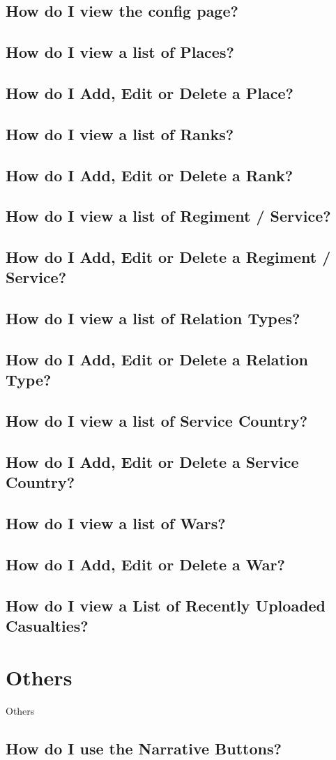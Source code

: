 \documentclass[12pt]{article}
\begin{document}
\subsection{How do I view the config page?}\label{ssec:config}
\subsection{How do I view a list of Places?}
\subsection{How do I Add, Edit or Delete a Place?}
\subsection{How do I view a list of Ranks?}
\subsection{How do I Add, Edit or Delete a Rank?}
\subsection{How do I view a list of Regiment / Service?}
\subsection{How do I Add, Edit or Delete a Regiment / Service?}
\subsection{How do I view a list of Relation Types?}
\subsection{How do I Add, Edit or Delete a Relation Type?}
\subsection{How do I view a list of Service Country?}
\subsection{How do I Add, Edit or Delete a Service Country?}
\subsection{How do I view a list of Wars?}
\subsection{How do I Add, Edit or Delete a War?}
\subsection{How do I view a List of Recently Uploaded Casualties?}

\section{Others}
Others
\subsection{How do I use the Narrative Buttons?}\label{ssec:narrative}
\end{document}
